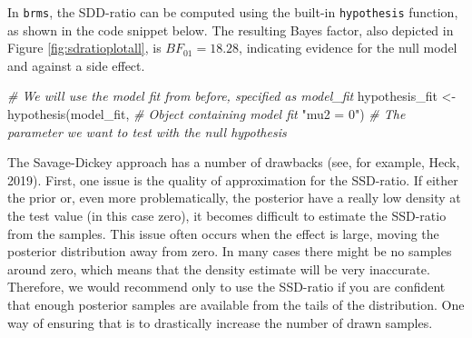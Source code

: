 \documentclass[
  english,
  doc,floatsintext]{apa6}
\newenvironment{Shaded}{\begin{snugshade}}{\end{snugshade}}
\newcommand{\CommentTok}[1]{\textcolor[rgb]{0.56,0.35,0.01}{\textit{#1}}}
\newcommand{\DecValTok}[1]{\textcolor[rgb]{0.00,0.00,0.81}{#1}}
\newcommand{\FloatTok}[1]{\textcolor[rgb]{0.00,0.00,0.81}{#1}}
\newcommand{\FunctionTok}[1]{\textcolor[rgb]{0.00,0.00,0.00}{#1}}
\newcommand{\NormalTok}[1]{#1}
\newcommand{\OtherTok}[1]{\textcolor[rgb]{0.56,0.35,0.01}{#1}}
\newcommand{\SpecialCharTok}[1]{\textcolor[rgb]{0.00,0.00,0.00}{#1}}
\newcommand{\StringTok}[1]{\textcolor[rgb]{0.31,0.60,0.02}{#1}}
\begin{document}
\begin{Shaded}
\end{Shaded}

\normalsize

In \texttt{brms}, the SDD-ratio can be computed using the built-in \texttt{hypothesis} function, as shown in the code snippet below. The resulting Bayes factor, also depicted in Figure \ref{fig:sdratioplotall}, is \(BF_{01} = 18.28\), indicating evidence for the null model and against a side effect.
~

\scriptsize

\begin{Shaded}
\begin{Highlighting}[]
\CommentTok{\# We will use the model fit from before, specified as model\_fit}
\NormalTok{hypothesis\_fit }\OtherTok{\textless{}{-}} \FunctionTok{hypothesis}\NormalTok{(model\_fit,    }\CommentTok{\# Object containing model fit }
                             \StringTok{"mu2 = 0"}\NormalTok{)   }\CommentTok{\# The parameter we want to test with the null hypothesis }
\end{Highlighting}
\end{Shaded}

\normalsize

The Savage-Dickey approach has a number of drawbacks (see, for example, Heck, 2019). First, one issue is the quality of approximation for the SSD-ratio. If either the prior or, even more problematically, the posterior have a really low density at the test value (in this case zero), it becomes difficult to estimate the SSD-ratio from the samples. This issue often occurs when the effect is large, moving the posterior distribution away from zero. In many cases there might be no samples around zero, which means that the density estimate will be very inaccurate. Therefore, we would recommend only to use the SSD-ratio if you are confident that enough posterior samples are available from the tails of the distribution. One way of ensuring that is to drastically increase the number of drawn samples.
\end{document}

